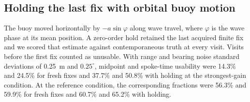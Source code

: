 \subsection{Holding the last fix with orbital buoy motion}
The buoy moved horizontally by $-a\sin\varphi$ along wave travel, where $\varphi$ is the wave phase at its mean position. A zero-order hold retained the last acquired finite fix and we scored that estimate against contemporaneous truth at every visit. Visits before the first fix counted as unusable. With range and bearing noise standard deviations of 0.25~m and $0.25^\circ$, midpoint and spoke-time usability were 14.3\% and 24.5\% for fresh fixes and 37.7\% and 50.8\% with holding at the strongest-gain condition. At the reference condition, the corresponding fractions were 56.3\% and 59.9\% for fresh fixes and 60.7\% and 65.2\% with holding.
